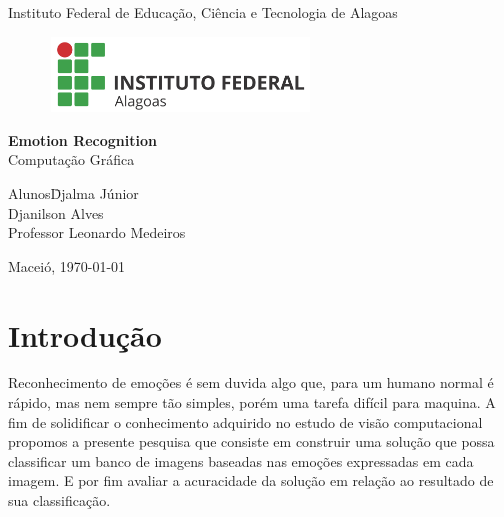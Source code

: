 \documentclass[a4paper, 12pt]{article}
\begin{document}
  
\begin{titlepage}
\begin{center}
  \huge{Instituto Federal de Educação, Ciência e Tecnologia de Alagoas}
  
  \vspace{10pt}
  \begin{figure}[!ht]
    \centering
    \includegraphics[height=2cm, width=7cm]{logo.jpg}
  \end{figure}
  
  \vspace{85pt}
  
  \textbf{\LARGE{Emotion Recognition}}\\
  \large{Computação Gráfica}
  \vspace{160pt}
  
\end{center}

\begin{flushleft}
  \begin{tabbing}
    Alunos\qquad\qquad\= Djalma Júnior\\
    \>Djanilson Alves\\
    Professor\> Leonardo Medeiros \\
  \end{tabbing}
\end{flushleft}

\begin{center}
  \vspace{\fill}
  Maceió, \today
\end{center}
\end{titlepage}


\newpage
\renewcommand{\contentsname}{Índice}
\tableofcontents
\thispagestyle{empty}

\newpage
{}


\section{Introdução}
Reconhecimento de emoções é sem duvida algo que, para um humano normal é rápido, mas nem sempre tão simples, porém uma tarefa difícil para maquina. A fim de solidificar o conhecimento adquirido no estudo de visão computacional propomos a presente pesquisa que consiste em construir uma solução que possa classificar um banco de imagens baseadas nas emoções expressadas em cada imagem. E por fim avaliar a acuracidade da solução em relação ao resultado de sua classificação.
\end{document}
